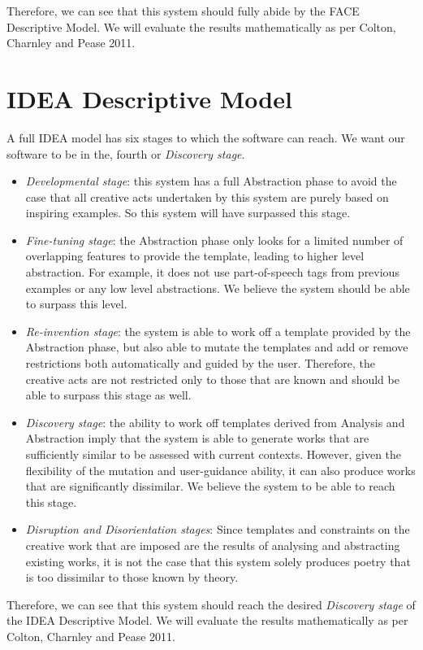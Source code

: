 Therefore, we can see that this system should fully abide by the FACE Descriptive Model. We will evaluate the results mathematically as per Colton, Charnley and Pease 2011.

\section{IDEA Descriptive Model}
A full IDEA model has six stages to which the software can reach. We want our software to be in the, fourth or \emph{Discovery stage}.

\begin{itemize}
\setlength{\itemsep}{0pt}
\item{\emph{Developmental stage}: this system has a full Abstraction phase to avoid the case that all creative acts undertaken by this system are purely based on inspiring examples. So this system will have surpassed this stage.}
\item{\emph{Fine-tuning stage}: the Abstraction phase only looks for a limited number of overlapping features to provide the template, leading to higher level abstraction. For example, it does not use part-of-speech tags from previous examples or any low level abstractions. We believe the system should be able to surpass this level.}
\item{\emph{Re-invention stage}: the system is able to work off a template provided by the Abstraction phase, but also able to mutate the templates and add or remove restrictions both automatically and guided by the user. Therefore, the creative acts are not restricted only to those that are known and should be able to surpass this stage as well.}
\item{\emph{Discovery stage}: the ability to work off templates derived from Analysis and Abstraction imply that the system is able to generate works that are sufficiently similar to be assessed with current contexts. However, given the flexibility of the mutation and user-guidance ability, it can also produce works that are significantly dissimilar. We believe the system to be able to reach this stage.}
\item{\emph{Disruption and Disorientation stages}: Since templates and constraints on the creative work that are imposed are the results of analysing and abstracting existing works, it is not the case that this system solely produces poetry that is too dissimilar to those known by theory. }
\end{itemize}

Therefore, we can see that this system should reach the desired \emph{Discovery stage} of the IDEA Descriptive Model. We will evaluate the results mathematically as per Colton, Charnley and Pease 2011.



